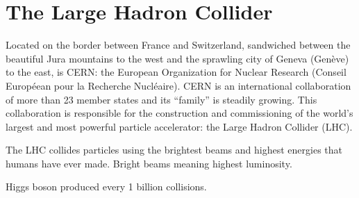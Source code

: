 \chapter{The Large Hadron Collider}
\label{ch:lhc}

Located on the border between France and Switzerland, sandwiched between the beautiful Jura mountains to the west and the sprawling city of Geneva (Genève) to the east, is CERN:
the European Organization for Nuclear Research 
(Conseil Européean pour la Recherche Nucléaire).
CERN is an international collaboration of more than 23 member states and its ``family'' is steadily growing.
This collaboration is responsible for the construction and commissioning of the world's largest and most powerful particle accelerator:
the Large Hadron Collider (LHC).

The LHC collides particles using the brightest beams and highest energies that humans have ever made.
Bright beams meaning highest luminosity.

Higgs boson produced every 1 billion collisions.
